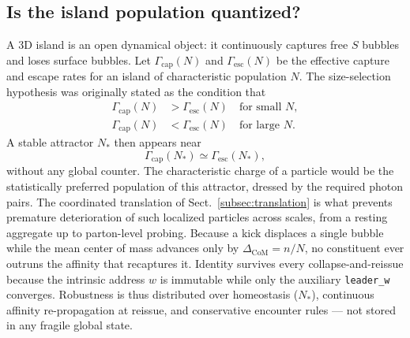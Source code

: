 \documentclass[a4paper]{article}
\begin{document}
\subsection{Is the island population quantized?}\label{subsec:dynamic-charge-quantization}
A 3D island is an open dynamical object: it continuously captures free $S$ bubbles and loses surface bubbles. Let $\Gamma_{\mathrm{cap}}(N)$ and $\Gamma_{\mathrm{esc}}(N)$ be the effective capture and escape rates for an island of characteristic population $N$. The size-selection hypothesis was originally stated as the condition that
\begin{align}
\Gamma_{\mathrm{cap}}(N) &> \Gamma_{\mathrm{esc}}(N) \quad \text{for small } N, \\
\Gamma_{\mathrm{cap}}(N) &< \Gamma_{\mathrm{esc}}(N) \quad \text{for large } N.
\end{align}
A stable attractor $N_*$ then appears near
\begin{equation}
\Gamma_{\mathrm{cap}}(N_*) \simeq \Gamma_{\mathrm{esc}}(N_*),
\end{equation}
without any global counter. The characteristic charge of a particle would be the statistically preferred population of this attractor, dressed by the required photon pairs.
The coordinated translation of Sect.~\ref{subsec:translation} is what prevents premature deterioration of such localized particles across scales, from a resting aggregate up to parton-level probing.  Because a kick displaces a single bubble while the mean center of mass advances only by $\Delta_{\mathrm{CoM}}=n/N$, no constituent ever outruns the affinity that recaptures it.  Identity survives every collapse-and-reissue because the intrinsic address $w$ is immutable while only the auxiliary \texttt{leader\_w} converges. Robustness is thus distributed over homeostasis ($N_*$), continuous affinity re-propagation at reissue, and conservative encounter rules --- not stored in any fragile global state.
\end{document}
